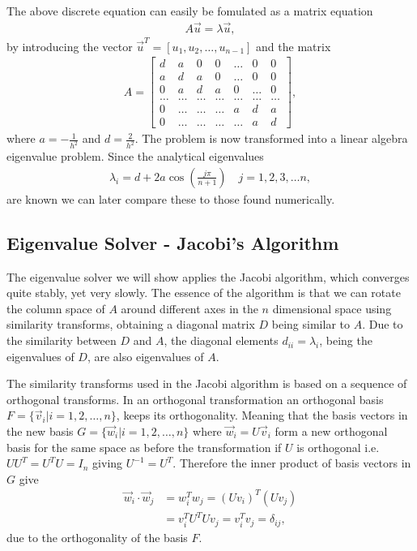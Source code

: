 \documentclass[twocolumn]{aastex62}
\begin{document}
The above discrete equation can easily be fomulated as a matrix equation 
\begin{align}
	A\vec{u} = \lambda\vec{u},
	\label{eq:matrix_eq}
\end{align}
by introducing the vector $\vec{u}^T = [u_1, u_2, \ldots, u_{n-1}]$ and the matrix
\begin{align}
A = 
	\begin{bmatrix} 
	d& a & 0   & 0    & \dots  &0     & 0 \\
    a & d & a & 0    & \dots  &0     &0 \\
    0   & a & d & a  &0       &\dots & 0\\
    \dots  & \dots & \dots & \dots  &\dots      &\dots & \dots\\
    0   & \dots & \dots & \dots  &a  &d & a\\
   0   & \dots & \dots & \dots  &\dots       &a & d
    \end{bmatrix} ,
\end{align}
where $a = -\frac{1}{h^2}$ and $d = \frac{2}{h^2}$.
The problem is now transformed into a linear algebra eigenvalue problem.  Since the analytical eigenvalues 
\begin{align}\label{eq:analyticaleig}
	\lambda_i = d + 2a \cos\left(\frac{j\pi}{n+1}\right)\quad j = 1, 2, 3, \ldots n,
\end{align}
are known we can later compare these to those found numerically.

\subsection{Eigenvalue Solver - Jacobi's Algorithm}
\label{sec:Jacobi}
The eigenvalue solver we will show applies the Jacobi algorithm, which converges quite stably, yet very slowly. The essence of the algorithm is that we can rotate the column space of $A$ around different axes in the $n$ dimensional space using similarity transforms, obtaining a diagonal matrix $D$ being similar to $A$. Due to the similarity between $D$ and $A$, the diagonal elements $d_{ii} = \lambda_i$, being the eigenvalues of $D$, are also eigenvalues of $A$.

The similarity transforms used in the Jacobi algorithm is based on a sequence of orthogonal transforms. In an orthogonal transformation an orthogonal basis $F = \{\vec{v}_i | i = 1, 2, \ldots, n\}$, keeps its orthogonality. Meaning that the basis vectors in the new basis $G = \{\vec{w}_i | i = 1, 2, \ldots, n\}$ where $\vec{w}_i = U\vec{v}_i$ form a new orthogonal basis for the same space as before the transformation if $U$ is orthogonal i.e. $UU^T = U^TU = I_n$ giving $U^{-1} = U^T$. Therefore the inner product of basis vectors in $G$ give 
\begin{align}
	\vec{w}_i\cdot \vec{w}_j &= w_i^Tw_j = (Uv_i)^T(Uv_j) \\
	&= v_i^TU^TUv_j = v_i^Tv_j = \delta_{ij},
\end{align}
due to the orthogonality of the basis $F$.
\end{document}
